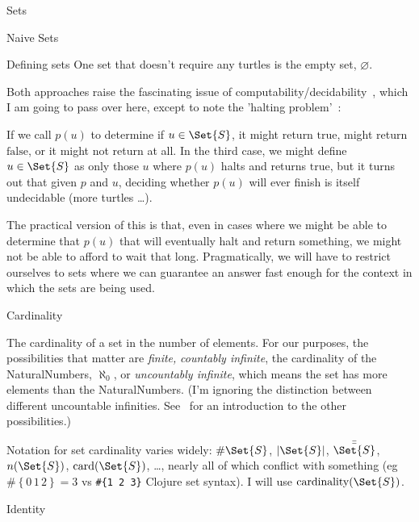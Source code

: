 \begin{plSection}{Sets}
\begin{plSection}{Naive Sets}
\begin{plSection}{Defining sets}
One set that doesn't require any turtles is 
the empty set, $\varnothing$.


Both approaches raise the fascinating issue of 
computability/decidability~\cite{Church:1936:Unsolvable,
Turing:1936:Computability,
Turing:1938:ComputabilityCorrection,
Turing:1937:ComputabilityLambda},
which I am going to pass over here, except to note the 
'halting problem'~\cite{wiki:HaltingProblem}:

If we call $p(u)$ to determine if $u \in \Set{S}$, 
it might return $\text{true}$, might return $\text{false}$,
or it might not return at all.
In the third case, we might define $u \in \Set{S}$ as only those
$u$ where $p(u)$ halts and returns $\text{true}$, but it turns 
out that given $p$ and $u$, deciding whether $p(u)$ will ever
finish is itself undecidable (more turtles \ldots).

The practical version of this is that, even in cases where we
might be able to determine that $p(u)$ that will eventually halt
and return something, we might not be able to afford to wait that
long.
Pragmatically, we will have to restrict ourselves to sets where we
can guarantee an answer fast enough for the context in which the
sets are being used.

\end{plSection}%
\begin{plSection}{Cardinality}

The cardinality of a set in the number of elements.
For our purposes, the possibilities that matter are \emph{finite,}
\emph{countably infinite}, the cardinality of the
\gls{NaturalNumbers}, $\aleph_{0}$, or \emph{uncountably
infinite}, which means the set has more elements than the
\gls{NaturalNumbers}.
(I'm ignoring the distinction between different uncountable
infinities.
See~\cite{wiki:CardinalNumbers} for an introduction to the other
possibilities.)

Notation for set cardinality varies widely:
$\#\Set{S}$,  $|\Set{S}|$,
$\bar{\bar{\Set{S}}}$, $n(\Set{S})$,
$\text{card}(\Set{S})$, \ldots, nearly all of which conflict
with something (eg $\#\left\{ 0 \, 1 \, 2 \right\} = 3$ vs 
\lstinline|#{1 2 3}| Clojure set syntax).
I will use $\text{cardinality}(\Set{S})$.

\end{plSection}%
\begin{plSection}{Identity}


\end{plSection}
\end{plSection}
\end{plSection}
